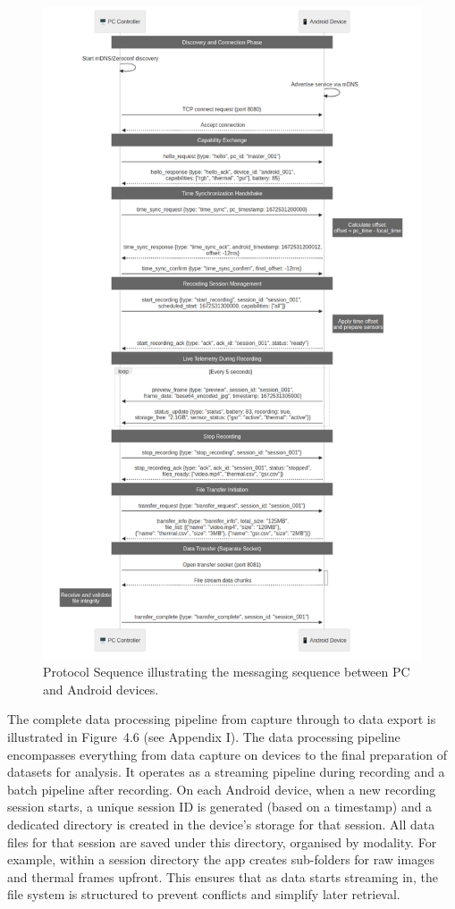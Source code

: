 \begin{figure}[htbp]
  \centering
  \includegraphics[width=\textwidth]{../../diagrams/fig_4_05_protocol_sequence.png}
  \caption{Protocol Sequence illustrating the messaging sequence between PC and Android devices.}
  \label{fig:4_05_protocol_sequence}
\end{figure}

The complete data processing pipeline from capture through to data export is illustrated in Figure~4.6 (see Appendix I). The data processing pipeline encompasses everything from data capture on devices to the final preparation of datasets for analysis. It operates as a streaming pipeline during recording and a batch pipeline after recording. On each Android device, when a new recording session starts, a unique session ID is generated (based on a timestamp) and a dedicated directory is created in the device's storage for that session. All data files for that session are saved under this directory, organised by modality. For example, within a session directory the app creates sub-folders for raw images and thermal frames upfront. This ensures that as data starts streaming in, the file system is structured to prevent conflicts and simplify later retrieval.

